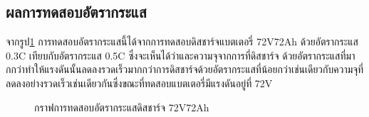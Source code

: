 \subsection{ผลการทดสอบอัตรากระแส}
จากรูป\ref{fig:C_rate_Test} การทดสอบอัตรากระแสนี้ได้จากการทดสอบดิสชาร์จแบตเตอรี่ 72V72Ah ด้วยอัตรากระแส 0.3C เทียบกับอัตรากระแส 0.5C ซึ่งจะเห็นได้ว่าและความจุจากการที่ดิสชาร์จ
ด้วยอัตรากระแสที่มากกว่าทำให้แรงดันนั้นลดลงรวดเร็วมากกว่าการดิสชาร์จด้วยอัตรากระแสที่น้อยกว่าเช่นเดียวกับความจุที่ลดลงอย่างรวดเร็วเช่นเดียวกันซึ่งขณะที่ทดสอบแบตเตอรี่มีแรงดันอยู่ที่ 72V
\begin{center}
	\begin{figure}[H]
		\centering
		\captionsetup{justification=centering,margin=2cm}
		\caption{กราฟการทดสอบอัตรากระแสดิสชาร์จ 72V72Ah}
		\label{fig:C_rate_Test}
	\end{figure}
\end{center}\nopagebreak